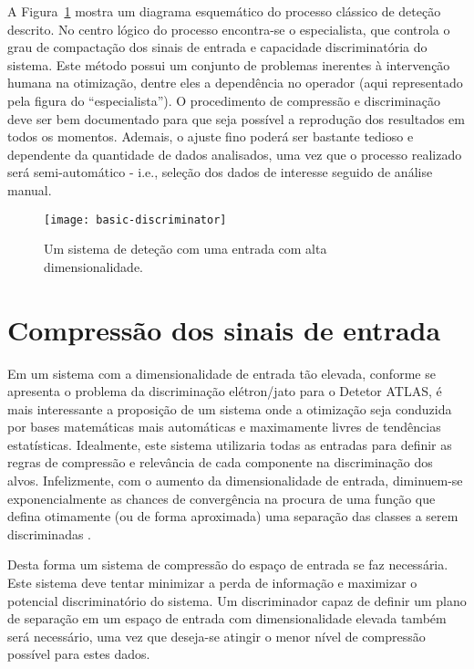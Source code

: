A Figura~\ref{fig:basic-discriminator} mostra um diagrama esquemático do
processo clássico de deteção descrito. No centro lógico do processo
encontra-se o especialista, que controla o grau de compactação dos sinais de
entrada e capacidade discriminatória do sistema. Este método possui um
conjunto de problemas inerentes à intervenção humana na otimização, dentre
eles a dependência no operador (aqui representado pela figura do
``especialista''). O procedimento de compressão e discriminação deve ser bem
documentado para que seja possível a reprodução dos resultados em todos os
momentos. Ademais, o ajuste fino poderá ser bastante tedioso e dependente da
quantidade de dados analisados, uma vez que o processo realizado será
semi-automático - i.e., seleção dos dados de interesse seguido de análise
manual.

\begin{figure}
\begin{center}
\texttt{[image: basic-discriminator]}
\end{center}
\caption{Um sistema  de deteção com uma entrada com alta
dimensionalidade.}
\label{fig:basic-discriminator}
\end{figure}

\section{Compressão dos sinais de entrada}

Em um sistema com a dimensionalidade de entrada tão elevada, conforme se
apresenta o problema da discriminação elétron/jato para o Detetor ATLAS, é
mais interessante a proposição de um sistema onde a otimização seja conduzida
por bases matemáticas mais automáticas e maximamente livres de tendências
estatísticas. Idealmente, este sistema utilizaria todas as entradas para
definir as regras de compressão e relevância de cada componente na
discriminação dos alvos. Infelizmente, com o aumento da dimensionalidade de
entrada, diminuem-se exponencialmente as chances de convergência na procura de
uma função que defina otimamente (ou de forma aproximada) uma separação das
classes a serem discriminadas \cite{haykin}. 

Desta forma um sistema de compressão do espaço de entrada se faz
necessária. Este sistema deve tentar minimizar a perda de informação e
maximizar o potencial discriminatório do sistema. Um discriminador capaz de
definir um plano de separação em um espaço de entrada com dimensionalidade
elevada também será necessário, uma vez que deseja-se atingir o menor nível de
compressão possível para estes dados. 

